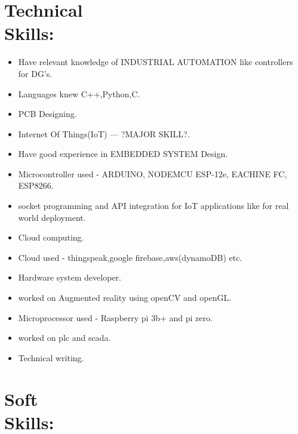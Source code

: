 \documentclass[10pt]{report}
\begin{document}
\section*{Technical \\Skills:} %
\begin{itemize}
\item Have relevant knowledge of INDUSTRIAL AUTOMATION like controllers for DG's.
\item Languages knew C++,Python,C.
\item PCB Designing.
\item Internet Of Things(IoT) --- ?MAJOR SKILL?. 
\item Have good experience in EMBEDDED SYSTEM Design.
\item Microcontroller used - ARDUINO, NODEMCU ESP-12e, EACHINE FC, ESP8266.
\item socket programming and API integration for IoT applications like for real world deployment.
\item Cloud computing.
\item Cloud used - thingspeak,google firebase,aws(dynamoDB) etc.
\item Hardware system developer.
\item worked on Augmented reality using openCV and openGL.
\item Microprocessor used - Raspberry pi 3b+ and pi zero.
\item worked on plc and scada.
\item Technical writing.
\end{itemize}

\section*{Soft \\Skills:}
\end{document}
